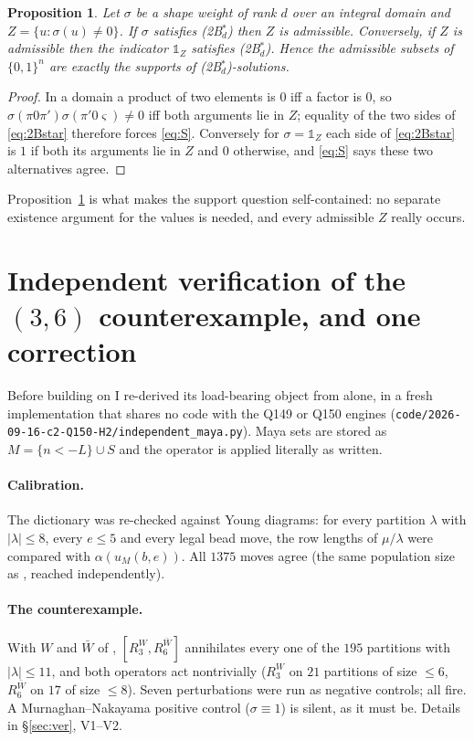 \documentclass[11pt]{article}
\newtheorem{proposition}[theorem]{Proposition}
\theoremstyle{definition}
\theoremstyle{remark}
\newcommand{\one}{\mathbb{1}}
\newcommand{\cube}{\{0,1\}}
\begin{document}
\begin{proposition}\label{prop:supp}
Let $\sigma$ be a shape weight of rank $d$ over an integral domain and
$Z=\{u:\sigma(u)\ne0\}$.  If $\sigma$ satisfies \textnormal{(2B$^*_d$)} then $Z$ is admissible.
Conversely, if $Z$ is admissible then the indicator $\one_Z$ satisfies
\textnormal{(2B$^*_d$)}.  Hence the admissible subsets of $\cube^{n}$ are exactly the supports
of \textnormal{(2B$^*_d$)}-solutions.
\end{proposition}

\begin{proof}
In a domain a product of two elements is $0$ iff a factor is $0$, so
$\sigma(\pi0\pi')\sigma(\pi'0\varsigma)\ne0$ iff both arguments lie in $Z$; equality of the two
sides of \eqref{eq:2Bstar} therefore forces \eqref{eq:S}.  Conversely for $\sigma=\one_Z$ each
side of \eqref{eq:2Bstar} is $1$ if both its arguments lie in $Z$ and $0$ otherwise, and
\eqref{eq:S} says these two alternatives agree.
\end{proof}

Proposition~\ref{prop:supp} is what makes the support question self-contained: no separate
existence argument for the values is needed, and every admissible $Z$ really occurs.

\section{Independent verification of the $(3,6)$ counterexample, and one correction}
\label{sec:verify36}

Before building on \cite{Q150c1} I re-derived its load-bearing object from
\cite[Conv.~1.2]{Q149} alone, in a fresh implementation that shares no code with the Q149 or
Q150 engines (\texttt{code/2026-09-16-c2-Q150-H2/independent\_maya.py}).  Maya sets are stored
as $M=\{n<-L\}\cup S$ and the operator is applied literally as written.

\paragraph{Calibration.}  The dictionary \cite[Lemma 1.3]{Q149} was re-checked against Young
diagrams: for every partition $\lambda$ with $|\lambda|\le8$, every $e\le5$ and every legal bead
move, the row lengths of $\mu/\lambda$ were compared with $\alpha(u_M(b,e))$.  All $1375$ moves
agree (the same population size as \cite[Check V1]{Q149}, reached independently).

\paragraph{The counterexample.}  With $W$ and $\bar W$ of \cite[Thm.~6.7]{Q150c1},
$[R_3^{W},R_6^{\bar W}]$ annihilates every one of the $195$ partitions with $|\lambda|\le11$,
and both operators act nontrivially ($R_3^{W}$ on $21$ partitions of size $\le6$, $R_6^{\bar W}$
on $17$ of size $\le8$).  Seven perturbations were run as negative controls; all fire.  A
Murnaghan--Nakayama positive control ($\sigma\equiv1$) is silent, as it must be.  Details in
\S\ref{sec:ver}, V1--V2.
\end{document}
